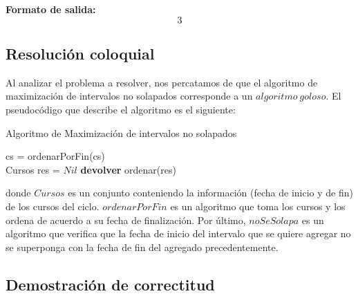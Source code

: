 \textbf{Formato de salida:} $$3$$

\subsection{Resolución coloquial}
Al analizar el problema a resolver, nos percatamos de que el algoritmo de maximización de intervalos no solapados corresponde a un $algoritmo\ goloso$. El pseudocódigo que describe el algoritmo es el siguiente:\newline

\begin{algorithm}[H]
	\SetAlgoLined
	\caption{Algoritmo de Maximización de intervalos no solapados}
	cs = ordenarPorFin(cs)\\
	Cursos res = $Nil$
	\textbf{devolver} ordenar(res)
\end{algorithm}

donde $Cursos$ es un conjunto conteniendo la información (fecha de inicio y de fin) de los cursos del ciclo. $ordenarPorFin$ es un algoritmo que toma los cursos y los ordena de acuerdo a su fecha de finalización. Por último, $noSeSolapa$ es un algoritmo que verifica que la fecha de inicio del intervalo que se quiere agregar no se superponga con la fecha de fin del agregado precedentemente.

\subsection{Demostración de correctitud}

